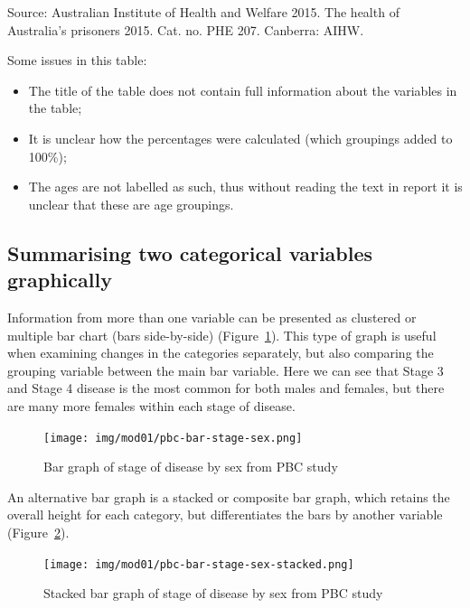 \documentclass[
  a4paper,
]{memoir}
\providecommand{\tightlist}{%
  \setlength{\itemsep}{0pt}\setlength{\parskip}{0pt}}\usepackage{longtable,booktabs,array}
\begin{document}
Source: Australian Institute of Health and Welfare 2015. The health of
Australia's prisoners 2015. Cat. no. PHE 207. Canberra: AIHW.

Some issues in this table:

\begin{itemize}
\tightlist
\item
  The title of the table does not contain full information about the
  variables in the table;
\item
  It is unclear how the percentages were calculated (which groupings
  added to 100\%);
\item
  The ages are not labelled as such, thus without reading the text in
  report it is unclear that these are age groupings.
\end{itemize}

\hypertarget{summarising-two-categorical-variables-graphically}{%
\subsection{Summarising two categorical variables
graphically}\label{summarising-two-categorical-variables-graphically}}

Information from more than one variable can be presented as clustered or
multiple bar chart (bars side-by-side) (Figure~\ref{fig-bar-2}). This
type of graph is useful when examining changes in the categories
separately, but also comparing the grouping variable between the main
bar variable. Here we can see that Stage 3 and Stage 4 disease is the
most common for both males and females, but there are many more females
within each stage of disease.

\begin{figure}[H]

{\centering \texttt{[image: img/mod01/pbc-bar-stage-sex.png]}

}

\caption{\label{fig-bar-2}Bar graph of stage of disease by sex from PBC
study}

\end{figure}

An alternative bar graph is a stacked or composite bar graph, which
retains the overall height for each category, but differentiates the
bars by another variable (Figure~\ref{fig-bar-3}).

\begin{figure}[H]

{\centering \texttt{[image: img/mod01/pbc-bar-stage-sex-stacked.png]}

}

\caption{\label{fig-bar-3}Stacked bar graph of stage of disease by sex
from PBC study}

\end{figure}
\end{document}
